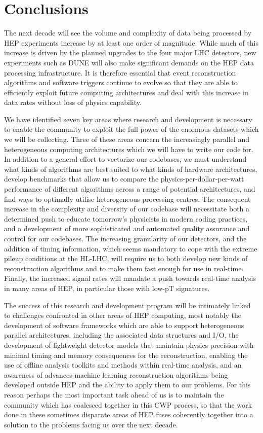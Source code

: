 \section{Conclusions}

The next decade will see the volume and complexity of data being processed by HEP experiments increase by at least one order of magnitude. While much of this increase is driven by the planned upgrades to the four major LHC detectors, new experiments such as DUNE will also make significant demands on the HEP data processing infrastructure. It is therefore essential that event reconstruction algorithms and software triggers continue to evolve so that they are able to efficiently exploit future computing architectures and deal with this increase in data rates without loss of physics capability. 

We have identified seven key areas where research and development is necessary to enable the community to exploit the full power of the enormous datasets which we will be collecting. Three of these areas concern the increasingly parallel and heterogeneous computing architectures which we will have to write our code for. In addition to a general effort to vectorize our codebases, we must understand what kinds of algorithms are best suited to what kinds of hardware architectures, develop benchmarks that allow us to compare the physics-per-dollar-per-watt performance of different algorithms across a range of potential architectures, and find ways to optimally utilise heterogeneous processing centres. The consequent increase in the complexity and diversity of our codebase will necessitate both a determined push to educate tomorrow’s physicists in modern coding practices, and a development of more sophisticated and automated quality assurance and control for our codebases. The increasing granularity of our detectors, and the addition of timing information, which seems mandatory to cope with the extreme pileup conditions at the HL-LHC, will require us to both develop new kinds of reconstruction algorithms and to make them fast enough for use in real-time. Finally, the increased signal rates will mandate a push towards real-time analysis in many areas of HEP, in particular those with low-pT signatures.

The success of this research and development program will be intimately linked to challenges confronted in other areas of HEP computing, most notably the development of software frameworks which are able to support heterogeneous parallel architectures, including the associated data structures and I/O, the development of lightweight detector models that maintain physics precision with minimal timing and memory consequences for the reconstruction, enabling the use of offline analysis toolkits and methods within real-time analysis, and an awareness of advances machine learning reconstruction algorithms being developed outside HEP and the ability to apply them to our problems. For this reason perhaps the most important task ahead of us is to maintain the community which has coalesced together in this CWP process, so that the work done in these sometimes disparate areas of HEP fuses coherently together into a solution to the problems facing us over the next decade.


 

